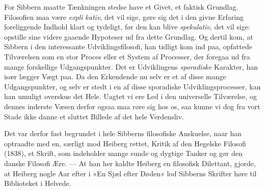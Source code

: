 \documentclass[12pt,a4paper,openany]{book}
\newcommand{\opage}[1]{\marginnote{\footnotesize\textit{[#1]}}}
\begin{document}
For Sibbern maatte Tænkningen stedse have et
Givet, et faktisk Grundlag. Filosofien maa være \textit{expli}%
\opage{22}\textit{kativ}, det vil sige, gøre sig det i den givne Erfaring
foreliggende Indhold klart og tydeligt, før den kan blive
\textit{spekulativ}, det vil sige: opstille sine videre gaaende
Hypoteser ud fra dette Grundlag. Og dertil kom, at
Sibbern i den interessante Udviklingsfilosofi, han tidligt
kom ind paa, opfattede Tilværelsen som en stor Proces
eller et System af Processer, der foregaa ud fra mange
forskellige Udgangspunkter. Det er Udviklingens \textit{sporadiske}
Karakter, han især lægger Vægt paa. Da den
Erkendende nu selv er et af disse mange Udgangspunkter,
og selv er stedt i en af disse sporadiske Udviklingsprocesser,
kan han umuligt overskue det Hele. Uagtet
vi ere Led i den universelle Tilværelse, og dennes
inderste Væsen derfor ogsaa maa røre sig hos os, saa
kunne vi dog fra vort Stade ikke danne et sluttet Billede
af det hele Verdensliv.

Det var derfor fast begrundet i hele Sibberns filosofiske
Anskuelse, naar han optraadte med en, særligt mod
Heiberg rettet, Kritik af den Hegelske Filosofi (1838), et
Skrift, som indeholder mange sunde og dygtige Tanker
og gør den danske Filosofi Ære. --- At han her kaldte
Heiberg en filosofisk Dilettant, gjorde, at Heiberg nogle
Aar efter i »En Sjæl efter Døden« lod Sibberns Skrifter
høre til Biblioteket i Helvede.
\end{document}
